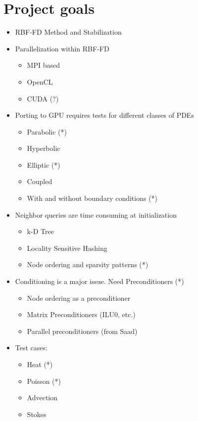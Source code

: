  
\section{Project goals}
\begin{itemize} 
	\item RBF-FD Method and Stabilization
	\item Parallelization within RBF-FD
	\begin{itemize} 
		\item MPI based
		\item OpenCL
		\item CUDA (?)
	\end{itemize} 
	\item Porting to GPU requires tests for different classes of PDEs
	\begin{itemize} 
		\item Parabolic (*)
		\item Hyperbolic
		\item Elliptic (*)
		\item Coupled
		\item With and without boundary conditions (*)
	\end{itemize} 
	\item Neighbor queries are time consuming at initialization 
	\begin{itemize} 
		\item k-D Tree
		\item Locality Sensitive Hashing 
		\item Node ordering and sparsity patterns (*)
	\end{itemize} 
	\item Conditioning is a major issue. Need Preconditioners (*)
	\begin{itemize} 
		\item Node ordering as a preconditioner 
		\item Matrix Preconditioners (ILU0, etc.)
		\item Parallel preconditioners (from Saad)
	\end{itemize} 
	\item Test cases: 
	\begin{itemize} 
		\item Heat (*)
		\item Poisson (*)
		\item Advection 
		\item Stokes
	\end{itemize} 
\end{itemize} 